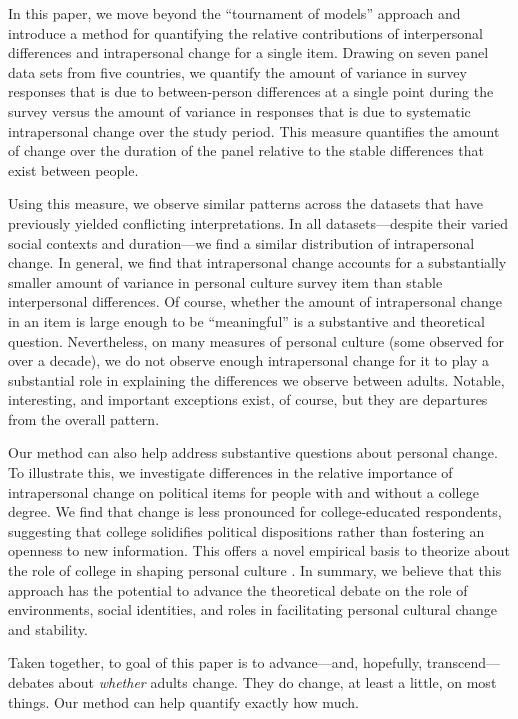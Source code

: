 \documentclass[
  12pt,
]{article}
\begin{document}
In this paper, we move beyond the ``tournament of models'' approach and
introduce a method for quantifying the relative contributions of
interpersonal differences and intrapersonal change for a single item.
Drawing on seven panel data sets from five countries, we quantify the
amount of variance in survey responses that is due to between-person
differences at a single point during the survey versus the amount of
variance in responses that is due to systematic intrapersonal change
over the study period. This measure quantifies the amount of change over
the duration of the panel relative to the stable differences that exist
between people.

Using this measure, we observe similar patterns across the datasets that
have previously yielded conflicting interpretations. In all
datasets---despite their varied social contexts and duration---we find a
similar distribution of intrapersonal change. In general, we find that
intrapersonal change accounts for a substantially smaller amount of
variance in personal culture survey item than stable interpersonal
differences. Of course, whether the amount of intrapersonal change in an
item is large enough to be ``meaningful'' is a substantive and
theoretical question. Nevertheless, on many measures of personal culture
(some observed for over a decade), we do not observe enough
intrapersonal change for it to play a substantial role in explaining the
differences we observe between adults. Notable, interesting, and
important exceptions exist, of course, but they are departures from the
overall pattern.

Our method can also help address substantive questions about personal
change. To illustrate this, we investigate differences in the relative
importance of intrapersonal change on political items for people with
and without a college degree. We find that change is less pronounced for
college-educated respondents, suggesting that college solidifies
political dispositions rather than fostering an openness to new
information. This offers a novel empirical basis to theorize about the
role of college in shaping personal culture . In summary, we believe
that this approach has the potential to advance the theoretical debate
on the role of environments, social identities, and roles in
facilitating personal cultural change and stability.

Taken together, to goal of this paper is to advance---and, hopefully,
transcend---debates about \emph{whether} adults change. They do change,
at least a little, on most things. Our method can help quantify exactly
how much.
\end{document}
